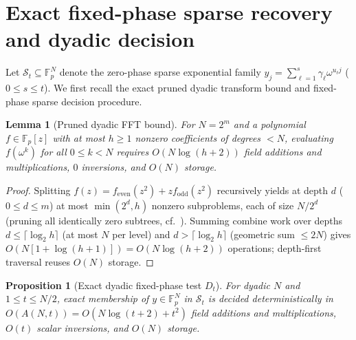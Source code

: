\documentclass[11pt,reqno]{amsart}
\numberwithin{equation}{section}
\newtheorem{proposition}[theorem]{Proposition}
\newtheorem{lemma}[theorem]{Lemma}
\theoremstyle{definition}
\theoremstyle{remark}
\newcommand{\F}{\mathbb{F}}
\begin{document}
\section{Exact fixed-phase sparse recovery and dyadic decision}
\label{sec:dyadic}

Let $\mathcal{S}_t\subseteq\F_p^N$ denote the zero-phase sparse exponential family $y_j = \sum_{\ell=1}^s \gamma_\ell \omega^{u_\ell j}$ ($0\le s\le t$). We first recall the exact pruned dyadic transform bound and fixed-phase sparse decision procedure.

\begin{lemma}[Pruned dyadic FFT bound]
\label{lem:pruned}
For $N = 2^m$ and a polynomial $f\in\F_p[z]$ with at most $h\ge 1$ nonzero coefficients of degrees $< N$, evaluating $f(\omega^k)$ for all $0\le k<N$ requires $O(N\log(h+2))$ field additions and multiplications, $0$ inversions, and $O(N)$ storage.
\end{lemma}

\begin{proof}
Splitting $f(z) = f_{\mathrm{even}}(z^2) + z f_{\mathrm{odd}}(z^2)$ recursively yields at depth $d$ ($0\le d\le m$) at most $\min(2^d, h)$ nonzero subproblems, each of size $N/2^d$ (pruning all identically zero subtrees, cf.~\cite{FFTW}). Summing combine work over depths $d\le \lceil\log_2 h\rceil$ (at most $N$ per level) and $d > \lceil\log_2 h\rceil$ (geometric sum $\le 2N$) gives $O(N[1+\log(h+1)]) = O(N\log(h+2))$ operations; depth-first traversal reuses $O(N)$ storage.
\end{proof}

\begin{proposition}[Exact dyadic fixed-phase test $D_t$]
\label{prop:Dt}
For dyadic $N$ and $1\le t\le N/2$, exact membership of $y\in\F_p^N$ in $\mathcal{S}_t$ is decided deterministically in $O(A(N,t)) = O(N\log(t+2) + t^2)$ field additions and multiplications, $O(t)$ scalar inversions, and $O(N)$ storage.
\end{proposition}
\end{document}
